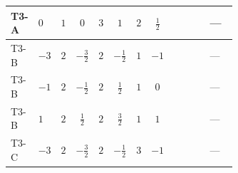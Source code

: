 \documentclass[8pt]{article}
\begin{document}
\begin{landscape}
\begin{longtable}{@{}llcccccc >{\raggedright\arraybackslash}p{0.21\linewidth} >{\raggedright\arraybackslash}p{0.21\linewidth} >{\raggedright\arraybackslash}p{0.21\linewidth}@{}}
\midrule
T3-A & $0$ & $1$ & $0$ & $3$ & $1$ & $2$ & $\frac{1}{2}$ & \scriptsize\adjustbox{max width=\linewidth}{$\begin{gathered} 8 {\lambda_{S_1}^{(1)}} T_{\nu}^{(1)}\end{gathered}$} & \scriptsize\adjustbox{max width=\linewidth}{$\begin{gathered} -8 \operatorname{Tr}\!\left({y_1}\,\left({y_1}\right)^{\dagger}\,{y_1}\,\left({y_1}\right)^{\dagger}\right)\end{gathered}$} & --- \\
\midrule
T3-B & $-3$ & $2$ & $-\frac{3}{2}$ & $2$ & $-\frac{1}{2}$ & $1$ & $-1$ & \scriptsize\adjustbox{max width=\linewidth}{$\begin{gathered} 4 {\lambda_{S_1}^{(1)}} T_{\nu}^{(1)}\end{gathered}$} & \scriptsize\adjustbox{max width=\linewidth}{$\begin{gathered} -4 \operatorname{Tr}\!\left({y_1}\,\left({y_1}\right)^{\dagger}\,{y_1}\,\left({y_1}\right)^{\dagger}\right)\end{gathered}$} & --- \\
\midrule
T3-B & $-1$ & $2$ & $-\frac{1}{2}$ & $2$ & $\frac{1}{2}$ & $1$ & $0$ & \scriptsize\adjustbox{max width=\linewidth}{$\begin{gathered} 4 {\lambda_{S_1}^{(1)}} T_{\nu}^{(1)}\end{gathered}$} & \scriptsize\adjustbox{max width=\linewidth}{$\begin{gathered} -4 \operatorname{Tr}\!\left({y_1}\,\left({y_1}\right)^{\dagger}\,{y_1}\,\left({y_1}\right)^{\dagger}\right)\end{gathered}$} & --- \\
\midrule
T3-B & $1$ & $2$ & $\frac{1}{2}$ & $2$ & $\frac{3}{2}$ & $1$ & $1$ & \scriptsize\adjustbox{max width=\linewidth}{$\begin{gathered} 4 {\lambda_{S_1}^{(1)}} T_{\nu}^{(1)}\end{gathered}$} & \scriptsize\adjustbox{max width=\linewidth}{$\begin{gathered} -4 \operatorname{Tr}\!\left({y_1}\,\left({y_1}\right)^{\dagger}\,{y_1}\,\left({y_1}\right)^{\dagger}\right)\end{gathered}$} & --- \\
\midrule
T3-C & $-3$ & $2$ & $-\frac{3}{2}$ & $2$ & $-\frac{1}{2}$ & $3$ & $-1$ & \scriptsize\adjustbox{max width=\linewidth}{$\begin{gathered} 6 {\lambda_{S_1}^{(1)}} T_{\nu}^{(1)}\end{gathered}$} & \scriptsize\adjustbox{max width=\linewidth}{$\begin{gathered} -5 \operatorname{Tr}\!\left({y_1}\,\left({y_1}\right)^{\dagger}\,{y_1}\,\left({y_1}\right)^{\dagger}\right)\end{gathered}$} & --- \\

\end{longtable}
\end{landscape}
\end{document}
